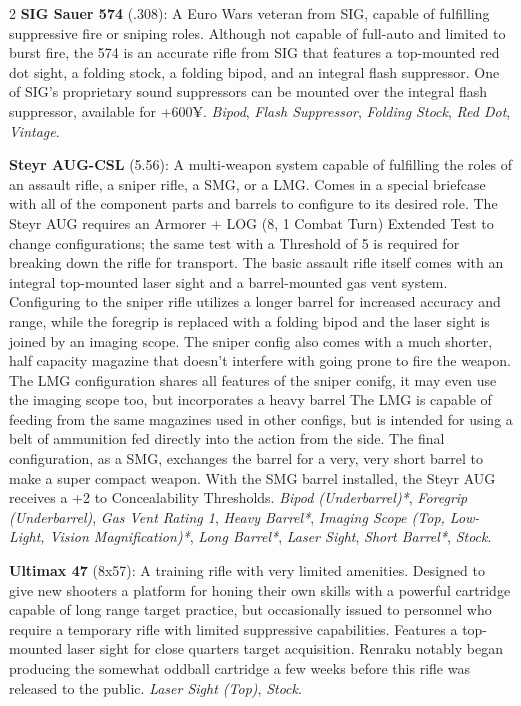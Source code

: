\documentclass[
  oneside]{article}
\begin{document}
\begin{multicols}{2}
\textbf{SIG Sauer 574} (.308): A Euro Wars veteran
from SIG, capable of fulfilling suppressive fire
or sniping roles. Although not capable of
full-auto and limited to burst fire, the 574 is an
accurate rifle from SIG that features a
top-mounted red dot sight, a folding stock, a
folding bipod, and an integral flash suppressor.
One of SIG's proprietary sound suppressors can be
mounted over the integral flash suppressor,
available for +600¥. \emph{Bipod}, \emph{Flash
Suppressor}, \emph{Folding Stock}, \emph{Red Dot},
\emph{Vintage}.

\textbf{Steyr AUG-CSL} (5.56): A multi-weapon
system capable of fulfilling the roles of an
assault rifle, a sniper rifle, a SMG, or a LMG.
Comes in a special briefcase with all of the
component parts and barrels to configure to its
desired role. The Steyr AUG requires an Armorer +
LOG (8, 1 Combat Turn) Extended Test to change
configurations; the same test with a Threshold of
5 is required for breaking down the rifle for
transport. The basic assault rifle itself comes
with an integral top-mounted laser sight and a
barrel-mounted gas vent system. Configuring to the
sniper rifle utilizes a longer barrel for
increased accuracy and range, while the foregrip
is replaced with a folding bipod and the laser
sight is joined by an imaging scope. The sniper
config also comes with a much shorter, half
capacity magazine that doesn't interfere with
going prone to fire the weapon. The LMG
configuration shares all features of the sniper
conifg, it may even use the imaging scope too, but
incorporates a heavy barrel The LMG is capable of
feeding from the same magazines used in other
configs, but is intended for using a belt of
ammunition fed directly into the action from the
side. The final configuration, as a SMG, exchanges
the barrel for a very, very short barrel to make a
super compact weapon. With the SMG barrel
installed, the Steyr AUG receives a +2 to
Concealability Thresholds. \emph{Bipod
(Underbarrel)*}, \emph{Foregrip (Underbarrel)},
\emph{Gas Vent Rating 1}, \emph{Heavy Barrel*},
\emph{Imaging Scope (Top, Low-Light, Vision
Magnification)*}, \emph{Long Barrel*}, \emph{Laser
Sight}, \emph{Short Barrel*}, \emph{Stock}.

\textbf{Ultimax 47} (8x57): A training rifle with
very limited amenities. Designed to give new
shooters a platform for honing their own skills
with a powerful cartridge capable of long range
target practice, but occasionally issued to
personnel who require a temporary rifle with
limited suppressive capabilities. Features a
top-mounted laser sight for close quarters target
acquisition. Renraku notably began producing the
somewhat oddball cartridge a few weeks before this
rifle was released to the public. \emph{Laser
Sight (Top)}, \emph{Stock}.


\end{multicols}
\end{document}
